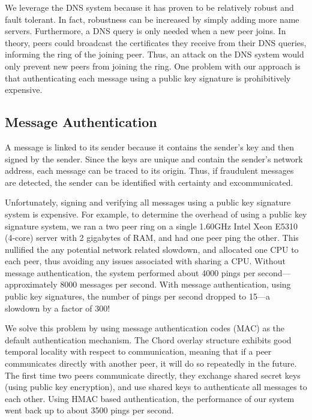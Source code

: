 \documentclass[11pt]{article}
\begin{document}
We leverage the DNS system because it has proven to be relatively
robust and fault tolerant.  In fact, robustness can be increased
by simply adding more name servers.  Furthermore, a DNS query is
only needed when a new peer joins.  In theory, peers could broadcast
the certificates they receive from their DNS queries, informing the
ring of the joining peer.  Thus, an attack on the DNS system would
only prevent new peers from joining the ring.  One problem with our
approach is that authenticating each message using a public key
signature is prohibitively expensive.


\subsection{Message Authentication}
A message is linked to its sender because it contains the sender's
key and then signed by the sender.  Since the keys are unique and 
contain the sender's network address, each message can be traced 
to its origin.  Thus, if fraudulent messages are detected, the 
sender can be identified with certainty and excommunicated.

Unfortunately, signing and verifying all messages using a public
key signature system is expensive.  For example, to determine the
overhead of using a public key signature system, we ran a two peer
ring on a single 1.60GHz Intel Xeon E5310 (4-core) server with
2 gigabytes of RAM, and had one peer ping the other.  This nullified
the any potential network related slowdown, and allocated one CPU
to each peer, thus avoiding any issues associated with sharing a
CPU.  Without message authentication, the system performed about
4000 pings per second---approximately 8000 messages per second.
With message authentication, using public key signatures, the number
of pings per second dropped to 15---a slowdown by a factor of 300!

We solve this problem by using message authentication codes (MAC)
as the default authentication mechanism.  The Chord overlay structure
exhibits good temporal locality with respect to communication,
meaning that if a peer communicates directly with another peer, it
will do so repeatedly in the future.  The first time two peers
communicate directly, they exchange shared secret keys (using public
key encryption), and use shared keys to authenticate all messages
to each other.  Using HMAC based authentication, the performance of
our system went back up to about 3500 pings per second.
\end{document}
